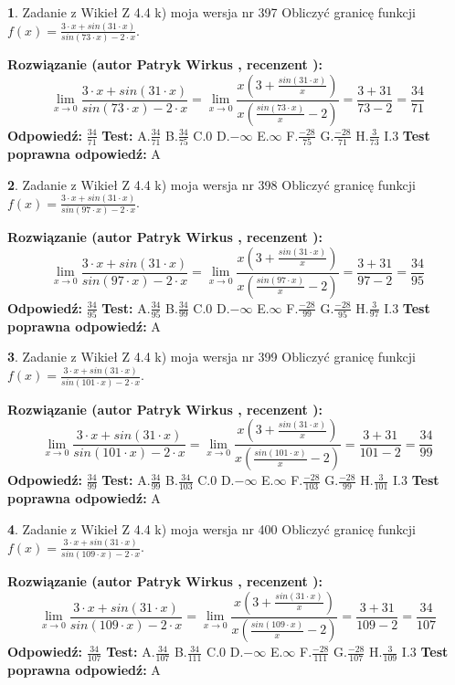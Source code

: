 \documentclass[12pt, a4paper]{article}
\theoremstyle{definition} %
\newtheorem{zad}{}
\newcommand{\zadStart}[1]{\begin{zad}#1\newline}
\newcommand{\zadStop}{\end{zad}}
\newcommand{\rozwStart}[2]{\noindent \textbf{Rozwiązanie (autor #1 , recenzent #2): }\newline}
\newcommand{\rozwStop}{\newline}
\newcommand{\odpStart}{\noindent \textbf{Odpowiedź:}\newline}
\newcommand{\odpStop}{\newline}
\newcommand{\testStart}{\noindent \textbf{Test:}\newline}
\newcommand{\testStop}{\newline}
\newcommand{\kluczStart}{\noindent \textbf{Test poprawna odpowiedź:}\newline}
\newcommand{\kluczStop}{\newline}
\begin{document}
\zadStart{Zadanie z Wikieł Z 4.4 k) moja wersja nr 397}
Obliczyć granicę funkcji $f(x)=\frac{3\cdot x +sin(31\cdot x)}{sin(73\cdot x) -2\cdot x}$.
\zadStop
\rozwStart{Patryk Wirkus}{}
$$\lim\limits_{x\to 0}\frac{3\cdot x +sin(31\cdot x)}{sin(73\cdot x) -2\cdot x}
=\lim\limits_{x\to 0}\frac{x(3+\frac{sin(31\cdot x)}{x})}{x(\frac{sin(73\cdot x)}{x}-2)}
=\frac{3+31}{73-2} = \frac{34}{71}$$
\rozwStop
\odpStart
$\frac{34}{71}$
\odpStop
\testStart
A.$\frac{34}{71}$
B.$\frac{34}{75}$
C.$0$
D.$-\infty$
E.$\infty$
F.$\frac{-28}{75}$
G.$\frac{-28}{71}$
H.$\frac{3}{73}$
I.$3$
\testStop
\kluczStart
A
\kluczStop



\zadStart{Zadanie z Wikieł Z 4.4 k) moja wersja nr 398}
Obliczyć granicę funkcji $f(x)=\frac{3\cdot x +sin(31\cdot x)}{sin(97\cdot x) -2\cdot x}$.
\zadStop
\rozwStart{Patryk Wirkus}{}
$$\lim\limits_{x\to 0}\frac{3\cdot x +sin(31\cdot x)}{sin(97\cdot x) -2\cdot x}
=\lim\limits_{x\to 0}\frac{x(3+\frac{sin(31\cdot x)}{x})}{x(\frac{sin(97\cdot x)}{x}-2)}
=\frac{3+31}{97-2} = \frac{34}{95}$$
\rozwStop
\odpStart
$\frac{34}{95}$
\odpStop
\testStart
A.$\frac{34}{95}$
B.$\frac{34}{99}$
C.$0$
D.$-\infty$
E.$\infty$
F.$\frac{-28}{99}$
G.$\frac{-28}{95}$
H.$\frac{3}{97}$
I.$3$
\testStop
\kluczStart
A
\kluczStop



\zadStart{Zadanie z Wikieł Z 4.4 k) moja wersja nr 399}
Obliczyć granicę funkcji $f(x)=\frac{3\cdot x +sin(31\cdot x)}{sin(101\cdot x) -2\cdot x}$.
\zadStop
\rozwStart{Patryk Wirkus}{}
$$\lim\limits_{x\to 0}\frac{3\cdot x +sin(31\cdot x)}{sin(101\cdot x) -2\cdot x}
=\lim\limits_{x\to 0}\frac{x(3+\frac{sin(31\cdot x)}{x})}{x(\frac{sin(101\cdot x)}{x}-2)}
=\frac{3+31}{101-2} = \frac{34}{99}$$
\rozwStop
\odpStart
$\frac{34}{99}$
\odpStop
\testStart
A.$\frac{34}{99}$
B.$\frac{34}{103}$
C.$0$
D.$-\infty$
E.$\infty$
F.$\frac{-28}{103}$
G.$\frac{-28}{99}$
H.$\frac{3}{101}$
I.$3$
\testStop
\kluczStart
A
\kluczStop



\zadStart{Zadanie z Wikieł Z 4.4 k) moja wersja nr 400}
Obliczyć granicę funkcji $f(x)=\frac{3\cdot x +sin(31\cdot x)}{sin(109\cdot x) -2\cdot x}$.
\zadStop
\rozwStart{Patryk Wirkus}{}
$$\lim\limits_{x\to 0}\frac{3\cdot x +sin(31\cdot x)}{sin(109\cdot x) -2\cdot x}
=\lim\limits_{x\to 0}\frac{x(3+\frac{sin(31\cdot x)}{x})}{x(\frac{sin(109\cdot x)}{x}-2)}
=\frac{3+31}{109-2} = \frac{34}{107}$$
\rozwStop
\odpStart
$\frac{34}{107}$
\odpStop
\testStart
A.$\frac{34}{107}$
B.$\frac{34}{111}$
C.$0$
D.$-\infty$
E.$\infty$
F.$\frac{-28}{111}$
G.$\frac{-28}{107}$
H.$\frac{3}{109}$
I.$3$
\testStop
\kluczStart
A
\kluczStop
\end{document}
